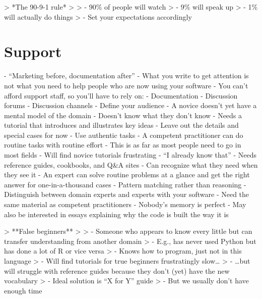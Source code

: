 \documentclass[10pt,letterpaper]{article}
\begin{document}
> *The 90-9-1 rule*
>
> - 90\% of people will watch
> - 9\% will speak up
> - 1\% will actually do things
> - Set your expectations accordingly

\section{Support}

- ``Marketing before, documentation after''
  - What you write to get attention is not what you need to help people who are now using your software
- You can't afford support staff, so you'll have to rely on:
  - Documentation
  - Discussion forums
  - Discussion channels
- Define your audience
- A novice doesn't yet have a mental model of the domain
  - Doesn't know what they don't know
  - Needs a tutorial that introduces and illustrates key ideas
    - Leave out the details and special cases for now
    - Use authentic tasks
- A competent practitioner can do routine tasks with routine effort
  - This is as far as most people need to go in most fields
  - Will find novice tutorials frustrating
    - ``I already know that''
  - Needs reference guides, cookbooks, and Q\&A sites
    - Can recognize what they need when they see it
- An expert can solve routine problems at a glance and get the right answer for one-in-a-thousand cases
  - Pattern matching rather than reasoning
  - Distinguish between domain experts and experts with your software
  - Need the same material as competent practitioners
    - Nobody's memory is perfect
  - May also be interested in essays explaining why the code is built the way it is

> **False beginners**
>
> - Someone who appears to know every little but can transfer understanding from another domain
>   - E.g., has never used Python but has done a lot of R or vice versa
>   - Knows how to program, just not in this language
> - Will find tutorials for true beginners frustratingly slow{\ldots}
> - {\ldots}but will struggle with reference guides because they don't (yet) have the new vocabulary
> - Ideal solution is ``X for Y'' guide
>   - But we usually don't have enough time
\end{document}
